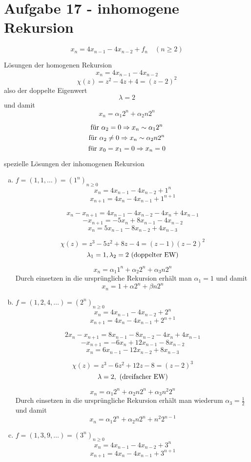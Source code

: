 \section*{Aufgabe 17 - inhomogene Rekursion}
\[ x_{n} = 4x_{n-1} - 4x_{n-2} + f_{n} \quad (n\geq 2) \]
\begin{flushenum}
\item
  Lösungen der homogenen Rekursion
  \[ x_{n} = 4x_{n-1} - 4x_{n-2} \]
  \[ \chi(z) = z^{2} - 4z + 4 = (z - 2)^{2} \]
  also der doppelte Eigenwert
  \[ \lambda = 2 \]
  und damit
  \[ x_{n} = \alpha_{1}2^{n} + \alpha_{2}n2^{n} \]

  \[ \textnormal{für } \alpha_{2} = 0 \Rightarrow x_{n} \sim \alpha_{1}2^{n} \]
  \[ \textnormal{für } \alpha_{2} \not= 0 \Rightarrow x_{n} \sim \alpha_{2}n2^{n} \]
  \[ \textnormal{für } x_{0} = x_{1} = 0 \Rightarrow x_{n} = 0 \]
\item
  spezielle Lösungen der inhomogenen Rekursion
  \begin{enumerate}[(a)]
    \item $f = (1, 1, \dots) = (1^{n})_{n\geq 0}$
      \[ x_{n} = 4x_{n-1} - 4x_{n-2} + 1^{n} \]
      \[ x_{n+1} = 4x_{n} - 4x_{n-1} + 1^{n+1} \]

      \[ x_{n} - x_{n+1} = 4x_{n-1} - 4x_{n-2} - 4x_{n} + 4x_{n-1} \]
      \[ -x_{n+1} = -5x_{n} + 8x_{n-1} - 4x_{n-2} \]
      \[ x_{n} = 5x_{n-1} - 8x_{n-2} + 4x_{n-3} \]

      \[ \chi(z) = z^{3} - 5z^{2} + 8z -  4 = (z - 1) (z - 2)^{2} \]
      \[ \lambda_{1} = 1, \lambda_{2} = 2 \textnormal{ (doppelter EW)} \]

      \[ x_{n} = \alpha_{1}1^{n} + \alpha_{2}2^{n} + \alpha_{3}n2^{n} \]
      Durch einsetzen in die ursprüngliche Rekursion erhält man $\alpha_{1} =
      1$ und damit
      \[ x_{n} = 1 + \alpha 2^{n} + \beta n2^{n} \]
    \item $f = (1, 2, 4, \dots) = (2^{n})_{n\geq 0}$
      \[ x_{n} = 4x_{n-1} - 4x_{n-2} + 2^{n} \]
      \[ x_{n+1} = 4x_{n} - 4x_{n-1} + 2^{n+1} \]

      \[ 2x_{n} - x_{n+1} = 8x_{n-1} - 8x_{n-2} - 4x_{n} + 4x_{n-1} \]
      \[ -x_{n+1} = -6x_{n} + 12x_{n-1} - 8x_{n-2} \]
      \[ x_{n} = 6x_{n-1} - 12x_{n-2} + 8x_{n-3} \]

      \[ \chi(z) = z^{3} - 6z^{2} + 12z - 8 = (z - 2)^{3} \]
      \[ \lambda = 2, \textnormal{ (dreifacher EW)} \]

      \[ x_{n} = \alpha_{1}2^{n} + \alpha_{2}n2^{n} + \alpha_{3}n^{2}2^{n} \]
      Durch einsetzen in die ursprüngliche Rekursion erhält man wiederum
      $\alpha_{3} = \frac{1}{2}$ und damit
      \[ x_{n} = \alpha_1 2^{n} + \alpha_2 n2^{n} + n^{2}2^{n-1}\]
    \item $f = (1, 3, 9, \dots) = (3^{n})_{n\geq 0}$
      \[ x_{n} = 4x_{n-1} - 4x_{n-2} + 3^{n} \]
      \[ x_{n+1} = 4x_{n} - 4x_{n-1} + 3^{n+1} \]


\end{enumerate}
\end{flushenum}
